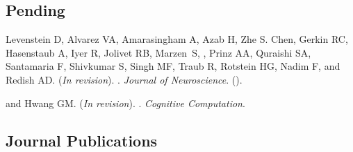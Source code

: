 \subsection*{Pending}
\label{sec:pendingpubs}

\begin{description}
  \item Levenstein D, Alvarez VA, Amarasingham A, Azab H, Zhe S. Chen, Gerkin
    RC, Hasenstaub A, Iyer R, Jolivet RB, Marzen~S, , Prinz AA,
    Quraishi SA, Santamaria F, Shivkumar S, Singh MF, Traub R, Rotstein HG, Nadim
    F, and Redish AD. (\emph{\color{lightred}In revision}). . \emph{Journal of Neuroscience}.
    (\href{https://arxiv.org/abs/2003.13825}{}).

  \item {} and Hwang GM. (\emph{\color{lightred}In revision}).
    . \emph{Cognitive Computation}.
\end{description}

\subsection*{Journal Publications}
\label{sec:journalpubs}


